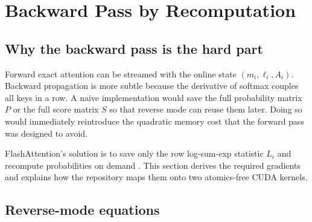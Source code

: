 \chapter{Backward Pass by Recomputation}
\label{chap:backward}

\section{Why the backward pass is the hard part}

Forward exact attention can be streamed with the online state $(m_i,\ell_i,A_i)$. Backward propagation is more subtle because the derivative of softmax couples all keys in a row. A naive implementation would save the full probability matrix $P$ or the full score matrix $S$ so that reverse mode can reuse them later. Doing so would immediately reintroduce the quadratic memory cost that the forward pass was designed to avoid.

FlashAttention's solution is to save only the row log-sum-exp statistic $L_i$ and recompute probabilities on demand \citep{dao2022flashattention}. This section derives the required gradients and explains how the repository maps them onto two atomics-free CUDA kernels.

\section{Reverse-mode equations}

